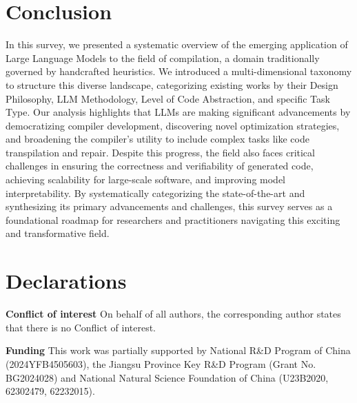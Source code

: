 \documentclass[pdflatex,sn-mathphys-ay,twocolumn, a4paper]{sn-jnl}%
\theoremstyle{thmstyleone}%
\theoremstyle{thmstyletwo}%
\theoremstyle{thmstylethree}%
\begin{document}
\section{Conclusion}\label{sec:conclusion}

In this survey, we presented a systematic overview of the emerging application of Large Language Models to the field of compilation, a domain traditionally governed by handcrafted heuristics. We introduced a multi-dimensional taxonomy to structure this diverse landscape, categorizing existing works by their Design Philosophy, LLM Methodology, Level of Code Abstraction, and specific Task Type. Our analysis highlights that LLMs are making significant advancements by democratizing compiler development, discovering novel optimization strategies, and broadening the compiler's utility to include complex tasks like code transpilation and repair. Despite this progress, the field also faces critical challenges in ensuring the correctness and verifiability of generated code, achieving scalability for large-scale software, and improving model interpretability. 
By systematically categorizing the state-of-the-art and synthesizing its primary advancements and challenges, this survey serves as a foundational roadmap for researchers and practitioners navigating this exciting and transformative field.

\section*{Declarations}


\textbf{Conflict of interest} On behalf of all authors, the corresponding author
states that there is no Conflict of interest.

\textbf{Funding} This work was partially supported by National R\&D Program of China (2024YFB4505603), the Jiangsu Province Key R\&D Program (Grant No. BG2024028) and National Natural Science Foundation of China (U23B2020, 62302479, 62232015).

\backmatter




\newpage
\begin{appendices}

\end{appendices}
\end{document}
